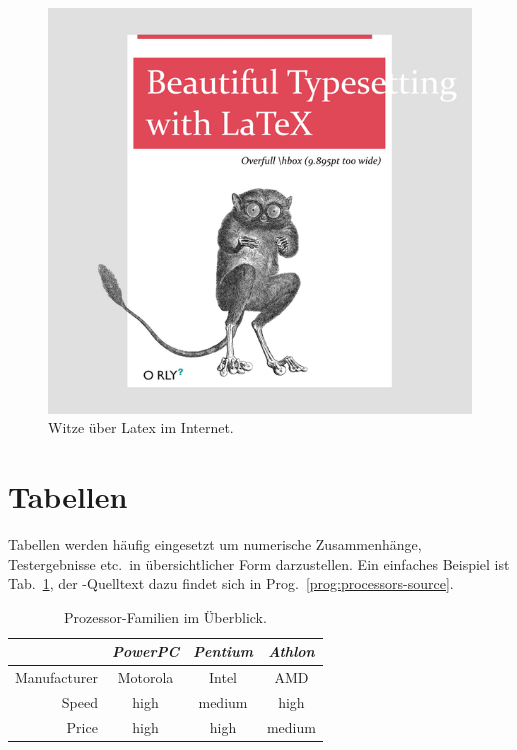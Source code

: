 \begin{figure}
\centering
\includegraphics[width=.85\textwidth]{LatexInternet}
\caption[]{Witze über Latex im Internet.\footnotemark }
\label{fig:latexinternet}
\end{figure}

\section{Tabellen}

Tabellen werden häufig eingesetzt um numerische Zusammenhänge, Testergebnisse
etc.\ in übersichtlicher Form darzustellen.
Ein einfaches Beispiel ist Tab.~\ref{tab:processors}, der \latex-Quelltext dazu
findet sich in Prog.~\ref{prog:processors-source}.


\begin{table}
\caption{Prozessor-Familien im Überblick.}
\label{tab:processors}
\centering
\setlength{\tabcolsep}{5mm}	%
\def\arraystretch{1.25}		%
\begin{tabular}{|r||c|c|c|} \hline
& \emph{PowerPC} & \emph{Pentium} & \emph{Athlon} \\
\hline\hline
Manufacturer & Motorola & Intel & AMD \\
\hline
Speed & high & medium & high   \\
\hline
Price & high & high   & medium \\
\hline
\end{tabular}
\end{table}

